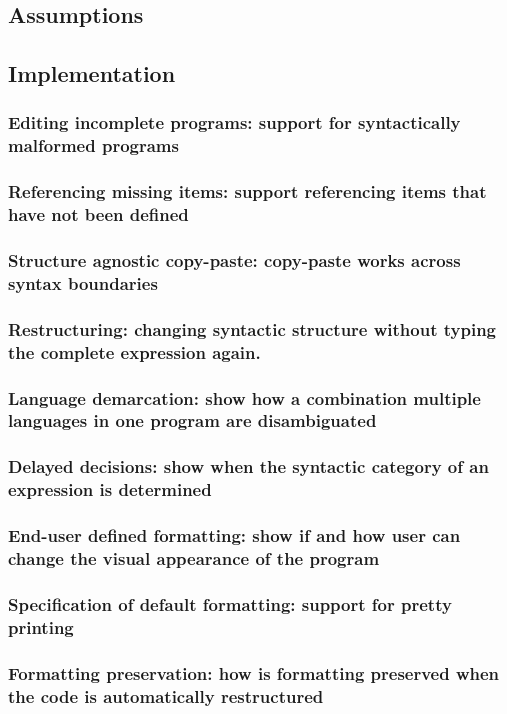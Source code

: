 \documentclass[preprint,numbers,10pt]{sigplanconf}
\begin{document}
\subsection{Assumptions}

\subsection{Implementation}

\subsubsection{Editing incomplete programs: support for syntactically malformed programs}
\subsubsection{Referencing missing items: support referencing items that have not been defined}
\subsubsection{Structure agnostic copy-paste: copy-paste works across syntax boundaries}
\subsubsection{Restructuring: changing syntactic structure without typing the complete expression again.}
\subsubsection{Language demarcation: show how a combination multiple languages in one program are disambiguated}
\subsubsection{Delayed decisions: show when the syntactic category of an expression is determined}
\subsubsection{End-user defined formatting: show if and how user can change the visual appearance of the program}
\subsubsection{Specification of default formatting: support for pretty printing}
\subsubsection{Formatting preservation: how is formatting preserved when the code is automatically restructured}
\end{document}
